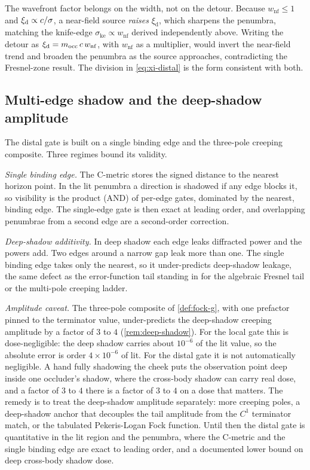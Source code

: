 \begin{remark}\label{rem:wnf-placement}
The wavefront factor belongs on the width, not on the detour. Because
$w_{\mathrm{nf}}\le1$ and $\xi_{\mathrm d}\propto c/\sigma$, a near-field source
\emph{raises} $\xi_{\mathrm d}$, which sharpens the penumbra, matching the knife-edge
$\sigma_{\mathrm{ke}}\propto w_{\mathrm{nf}}$ derived independently above. Writing
the detour as $\xi_{\mathrm d}=m_{\mathrm{occ}}\,c\,w_{\mathrm{nf}}$, with
$w_{\mathrm{nf}}$ as a multiplier, would invert the near-field trend and broaden the
penumbra as the source approaches, contradicting the Fresnel-zone result. The
division in \cref{eq:xi-distal} is the form consistent with both.
\end{remark}

\subsection{Multi-edge shadow and the deep-shadow amplitude}\label{sec:cmetric-validity}

\begin{remark}\label{rem:distal-validity}
The distal gate is built on a single binding edge and the three-pole creeping
composite. Three regimes bound its validity.

\emph{Single binding edge.} The C-metric stores the signed distance to the nearest
horizon point. In the lit penumbra a direction is shadowed if any edge blocks it,
so visibility is the product (AND) of per-edge gates, dominated by the nearest,
binding edge. The single-edge gate is then exact at leading order, and overlapping
penumbrae from a second edge are a second-order correction.

\emph{Deep-shadow additivity.} In deep shadow each edge leaks diffracted power and
the powers add. Two edges around a narrow gap leak more than one. The single
binding edge takes only the nearest, so it under-predicts deep-shadow leakage, the
same defect as the error-function tail standing in for the algebraic Fresnel tail
or the multi-pole creeping ladder.

\emph{Amplitude caveat.} The three-pole composite of \cref{def:fock-g}, with one
prefactor pinned to the terminator value, under-predicts the deep-shadow creeping
amplitude by a factor of $3$ to $4$ (\cref{rem:deep-shadow}). For the local gate
this is dose-negligible: the deep shadow carries about $10^{-6}$ of the lit value,
so the absolute error is order $4\times10^{-6}$ of lit. For the distal gate it is
not automatically negligible. A hand fully shadowing the cheek puts the
observation point deep inside one occluder's shadow, where the cross-body shadow
can carry real dose, and a factor of $3$ to $4$ there is a factor of $3$ to $4$ on
a dose that matters. The remedy is to treat the deep-shadow amplitude separately:
more creeping poles, a deep-shadow anchor that decouples the tail amplitude from
the $C^1$ terminator match, or the tabulated Pekeris-Logan Fock function. Until
then the distal gate is quantitative in the lit region and the penumbra, where the
C-metric and the single binding edge are exact to leading order, and a documented
lower bound on deep cross-body shadow dose.
\end{remark}
